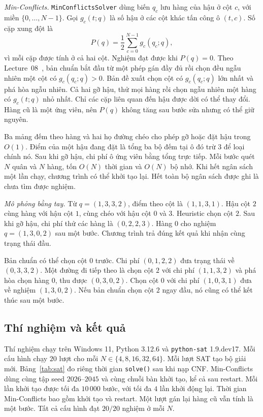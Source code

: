 \documentclass[conference]{IEEEtran}
\begin{document}
\textit{Min-Conflicts.}
\texttt{MinConflictsSolver} dùng biến $q_c$ lưu hàng của hậu ở
cột $c$, với miền $\{0,\ldots,N-1\}$. Gọi $g_c(t;q)$ là số hậu
ở các cột khác tấn công ô $(t,c)$. Số cặp xung đột là
\begin{equation}
P(q)=\frac12\sum_{c=0}^{N-1} g_c(q_c;q),
\end{equation}
vì mỗi cặp được tính ở cả hai cột. Nghiệm đạt được khi $P(q)=0$.
Theo Lecture~08~\cite{lec08}, bản chuẩn bắt đầu từ một phép
gán đầy đủ rồi chọn đều ngẫu nhiên một cột có $g_c(q_c;q)>0$.
Bản đề xuất chọn cột có $g_c(q_c;q)$ lớn nhất và phá hòa ngẫu
nhiên. Cả hai gỡ hậu, thử mọi hàng rồi chọn ngẫu nhiên một hàng
có $g_c(t;q)$ nhỏ nhất. Chỉ các cặp liên quan đến hậu được dời
có thể thay đổi. Hàng cũ là một ứng viên, nên $P(q)$ không
tăng sau bước sửa nhưng có thể giữ nguyên.

Ba mảng đếm theo hàng và hai họ đường chéo cho phép gỡ hoặc đặt
hậu trong $O(1)$. Điểm của một hậu đang đặt là tổng ba bộ đếm
tại ô đó trừ $3$ để loại chính nó. Sau khi gỡ hậu, chi phí ô ứng
viên bằng tổng trực tiếp. Mỗi bước quét $N$ quân và $N$ hàng, tốn
$O(N)$ thời gian và $O(N)$ bộ nhớ. Khi hết ngân sách một lần chạy,
chương trình có thể khởi tạo lại. Hết toàn bộ ngân sách được ghi
là chưa tìm được nghiệm.

\textit{Mô phỏng bằng tay.}
Từ $q=(1,3,3,2)$, điểm theo cột là $(1,1,3,1)$. Hậu cột $2$
cùng hàng với hậu cột $1$, cùng chéo với hậu cột $0$ và $3$.
Heuristic chọn cột $2$. Sau khi gỡ hậu, chi phí thử các hàng là
$(0,2,2,3)$. Hàng $0$ cho nghiệm $q=(1,3,0,2)$ sau một bước.
Chương trình trả đúng kết quả khi nhận cùng trạng thái đầu.

Bản chuẩn có thể chọn cột $0$ trước. Chi phí $(0,1,2,2)$ đưa
trạng thái về $(0,3,3,2)$. Một đường đi tiếp theo là chọn cột
$2$ với chi phí $(1,1,3,2)$ và phá hòa chọn hàng $0$, thu được
$(0,3,0,2)$. Chọn cột $0$ với chi phí $(1,0,3,1)$ đưa về
nghiệm $(1,3,0,2)$. Nếu bản chuẩn chọn cột $2$ ngay đầu, nó
cũng có thể kết thúc sau một bước.

\subsection{Thí nghiệm và kết quả}
Thí nghiệm chạy trên Windows 11, Python 3.12.6 và \texttt{python-sat}
1.9.dev17. Mỗi cấu hình chạy $20$ lượt cho mỗi
$N\in\{4,8,16,32,64\}$. Mỗi lượt SAT tạo bộ giải mới. Bảng~\ref{tab:sat}
đo riêng thời gian \texttt{solve()} sau khi nạp CNF. Min-Conflicts
dùng cùng tập seed $2026$--$2045$ và cùng chuỗi bàn khởi tạo, kể
cả sau restart. Mỗi lần khởi tạo được tối đa $10\,000$ bước,
với tối đa $4$ lần khởi động lại. Thời gian Min-Conflicts bao
gồm khởi tạo và restart. Một lượt gán lại hàng cũ vẫn tính
là một bước. Tất cả cấu hình đạt $20/20$ nghiệm ở mỗi $N$.
\end{document}
